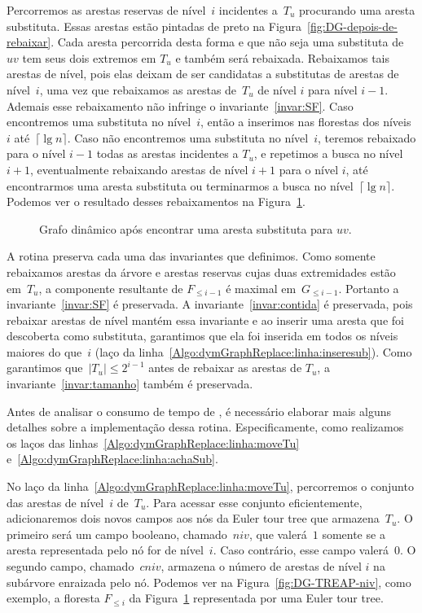 Percorremos as arestas reservas de nível~$i$ incidentes a~$T_u$ procurando uma aresta substituta. Essas arestas estão pintadas de preto na Figura~\ref{fig:DG-depois-de-rebaixar}. Cada aresta percorrida desta forma e que não seja uma substituta de~$uv$ tem seus dois extremos em $T_u$ e também será rebaixada.
Rebaixamos tais arestas de nível, pois elas deixam de ser candidatas a substitutas de arestas de nível~$i$, uma vez que rebaixamos as arestas de~$T_u$ de nível $i$ para nível $i-1$. 
Ademais esse rebaixamento não infringe o invariante~\ref{invar:SF}.
Caso encontremos uma substituta no nível~$i$, então a inserimos nas florestas dos níveis~$i$ até~$\lceil \lg n \rceil$. Caso não encontremos uma substituta no nível~$i$, teremos rebaixado para o nível $i-1$ todas as arestas incidentes a $T_u$, e repetimos a busca no nível~$i+1$, eventualmente rebaixando arestas de nível $i+1$ para o nível $i$, até encontrarmos uma aresta substituta ou terminarmos a busca no nível~$\lceil \lg n \rceil$. Podemos ver o resultado desses rebaixamentos na Figura~\ref{fig:DG-depois-achou-sub}.
\begin{figure}[htb]
\centering
\caption{Grafo dinâmico após encontrar uma aresta substituta para $uv$.}
\label{fig:DG-depois-achou-sub}
\end{figure}

A rotina \dymGraphReplace{} preserva cada uma das invariantes que definimos. 
Como somente rebaixamos arestas da árvore e arestas reservas cujas duas extremidades estão em~$T_u$, a componente resultante de $F_{\leqslant i-1}$ é maximal em~$G_{\leqslant i-1}$. Portanto a invariante~\ref{invar:SF} é preservada.
A invariante~\ref{invar:contida} é preservada, pois rebaixar arestas de nível mantém essa invariante e ao inserir uma aresta que foi descoberta como substituta, garantimos que ela foi inserida em todos os níveis maiores do que~$i$ (laço da linha~\ref{Algo:dymGraphReplace:linha:inseresub}).  
Como garantimos que~$|T_u| \leqslant 2^{i-1}$ antes de rebaixar as arestas de $T_u$, a invariante~\ref{invar:tamanho} também é preservada.

Antes de analisar o consumo de tempo de \dymGraphReplace{}, é necessário elaborar mais alguns detalhes sobre a implementação dessa rotina.
Especificamente, como realizamos os laços das linhas~\ref{Algo:dymGraphReplace:linha:moveTu} e~\ref{Algo:dymGraphReplace:linha:achaSub}.

No laço da linha~\ref{Algo:dymGraphReplace:linha:moveTu}, percorremos o conjunto das arestas de nível~$i$ de~$T_u$. Para acessar esse conjunto eficientemente, adicionaremos dois novos campos aos nós da Euler tour tree que armazena~$T_u$. O primeiro será um campo booleano, chamado~$niv$, que valerá~$1$ somente se a aresta representada pelo nó for de nível~$i$. Caso contrário, esse campo valerá~$0$. O segundo campo, chamado~$cniv$, armazena o número de arestas de nível $i$ na subárvore enraizada pelo nó. Podemos ver na Figura~\ref{fig:DG-TREAP-niv}, como exemplo, a floresta $F_{\leqslant i}$ da Figura~\ref{fig:DG-depois-achou-sub} representada por uma Euler tour tree.

